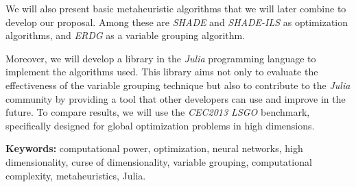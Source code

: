 We will also present basic metaheuristic algorithms that we will later combine to develop our proposal. Among these are \textit{SHADE} and \textit{SHADE-ILS} as optimization algorithms, and \textit{ERDG} as a variable grouping algorithm.

Moreover, we will develop a library in the \textit{Julia} programming language to implement the algorithms used. This library aims not only to evaluate the effectiveness of the variable grouping technique but also to contribute to the \textit{Julia} community by providing a tool that other developers can use and improve in the future. To compare results, we will use the \textit{CEC2013 LSGO} benchmark, specifically designed for global optimization problems in high dimensions.

\textbf{Keywords:} computational power, optimization, neural networks, high dimensionality, curse of dimensionality, variable grouping, computational complexity, metaheuristics, Julia.


\endinput
